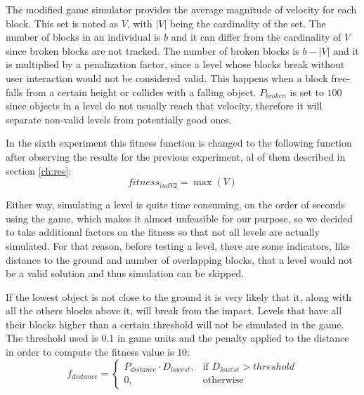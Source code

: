 \documentclass[sigconf]{acmart}
\begin{document}
The modified 
game simulator provides the average magnitude of
velocity for each block. %
This set is noted as $V$, with $|V|$ being the cardinality of the set. The number of blocks in an individual is $b$ and it can differ from the cardinality of $V$ since broken blocks are not tracked. The number of broken blocks is $b-|V|$ and it is multiplied by a penalization factor, since a level whose blocks break without user interaction would not be considered valid. This happens when a block free-falls from a certain height or collides with a falling object. 
$P_{broken}$ is set to $100$ since objects in a level do not usually reach that 
velocity, therefore it will separate non-valid levels from potentially good 
ones.

In the sixth experiment this fitness function is changed to the following function after observing the results for the previous experiment, al of them described in section \ref{ch:res}:
$$fitness_{indV2} = \max{(V)}$$


Either way, simulating a level is quite time consuming, on the order of
seconds using the game, which makes it almost unfeasible for our purpose, so we
decided to take additional factors on the fitness so that not all
levels are actually simulated. 
For that reason, before testing a level, there are some indicators, like
distance to the ground and number of overlapping blocks, that a level would 
not be a valid solution
and thus simulation can be skipped.

If the lowest object is not close to the ground it is very likely that
it, along with all the others blocks above it, 
will break from the impact. Levels that have all their blocks higher than a 
certain threshold will not be simulated in the game. The threshold used is 
$0.1$ in game units and the penalty applied to the distance in order
to compute the fitness value is $10$:
$$f_{distance} = 
\begin{cases}
P_{distance}\cdot D_{lowest}, & \text{if } D_{lowest} > threshold\\
0, & \text{otherwise}
\end{cases}
$$
\end{document}
